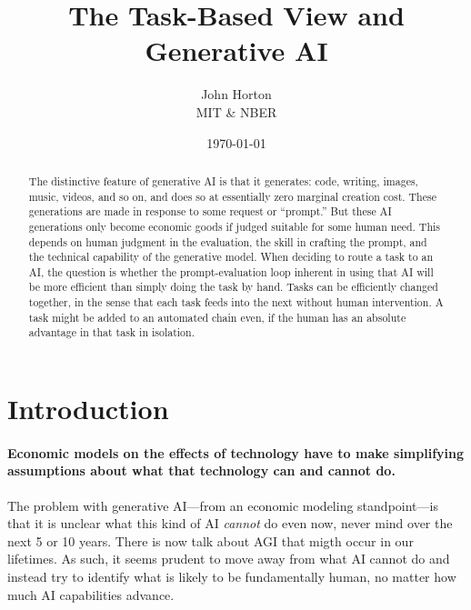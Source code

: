 \documentclass{article}
\begin{document}
\title{The Task-Based View and Generative AI}
\author{John Horton\\MIT \& NBER}
\date{\today{}}

\newcommand{\machine}[1]{\langle #1 \rangle}
\newcommand{\human}[1]{( #1 )}
\newcommand{\cost}[1]{C\{ #1 \}}
\newcommand{\costdo}[1]{C_H\{ #1 \}}
\newcommand{\costmanage}[1]{C_M\{ #1 \}}

\newcommand{\topic}[1]{\paragraph{#1}}

\maketitle

\begin{abstract}
\noindent The distinctive feature of generative AI is that it generates: code, writing, images, music, videos, and so on, and does so at essentially zero marginal creation cost.
These generations are made in response to some request or ``prompt.''
But these AI generations only become economic goods if judged suitable for some human need.
This depends on human judgment in the evaluation, the skill in crafting the prompt, and the technical capability of the generative model. 
When deciding to route a task to an  AI, the question is whether the prompt-evaluation loop inherent in using that AI will be more efficient than simply doing the task by hand. 
Tasks can be efficiently changed together, in the sense that each task feeds into the next without human intervention.
A task might be added to an automated chain even, if the human has an absolute advantage in that task in isolation.
\end{abstract}

\onehalfspacing

\section{Introduction}
\topic{Economic models on the effects of technology have to make simplifying assumptions about what that technology can and cannot do.}
The problem with generative AI---from an economic modeling standpoint---is that it is unclear what this kind of AI \emph{cannot} do even now, never mind over the next 5 or 10 years.
There is now talk about AGI that migth occur in our lifetimes.
As such, it seems prudent to move away from what AI cannot do and instead try to identify what is likely to be fundamentally human, no matter how much AI capabilities advance.
\end{document}

